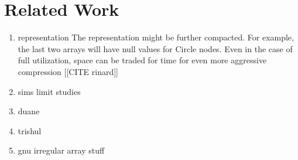 \section{Related Work}
\begin{enumerate}
\item representation The representation might be further compacted. For example, the last two arrays will have null values for Circle nodes. Even in the case of full utilization, space can be traded for time for even more aggressive compression [[CITE rinard]]
\item sims limit studies
\item duane
\item trishul
\item gnu irregular array stuff
\end{enumerate}
